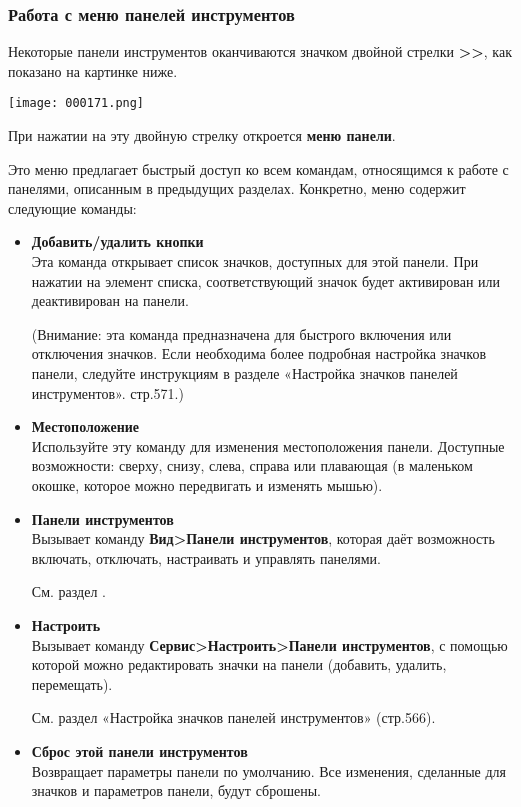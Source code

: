 ﻿\documentclass[a4paper,10pt]{article}
\begin{document}
 \subsubsection{Работа с меню панелей инструментов}
 Некоторые панели инструментов оканчиваются значком двойной стрелки \textbf{>>}, как показано на картинке ниже. 
 
 \texttt{[image: 000171.png]}
 
 При нажатии на эту двойную стрелку откроется \textbf{меню панели}.
 
 Это меню предлагает быстрый доступ ко всем командам, относящимся к работе с панелями, описанным в предыдущих разделах. Конкретно, меню содержит следующие команды:
 
 \begin{itemize}
  \item \textbf{Добавить/удалить кнопки}\\
  Эта команда открывает список значков, доступных для этой панели. При нажатии на элемент списка, соответствующий значок будет активирован или деактивирован на панели.
  
  (Внимание: эта команда предназначена для быстрого включения или отключения значков. Если необходима более подробная настройка значков панели, следуйте инструкциям в разделе «Настройка значков панелей инструментов». стр.571.)
  \item \textbf{Местоположение}\\
  Используйте эту команду для изменения местоположения панели. Доступные возможности: сверху, снизу, слева, справа или плавающая (в маленьком окошке, которое можно передвигать и изменять мышью).
  \item \textbf{Панели инструментов}\\
  Вызывает команду \textbf{Вид>Панели инструментов}, которая даёт возможность включать, отключать, настраивать и управлять панелями.
  
  См. раздел .
\item \textbf{Настроить}\\
Вызывает команду \textbf{Сервис>Настроить>Панели инструментов}, с помощью которой можно редактировать значки на панели (добавить, удалить, перемещать).

См. раздел «Настройка значков панелей инструментов» (стр.566).
\item \textbf{Сброс этой панели инструментов}\\
Возвращает параметры панели по умолчанию. Все изменения, сделанные для значков и параметров панели, будут сброшены.
 \end{itemize}
 
\end{document}
